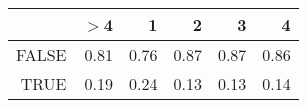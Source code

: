 \begin{table}[ht]
\centering
\begin{tabular}{rrrrrr}
  \hline
 & $>$4 & 1 & 2 & 3 & 4 \\ 
  \hline
FALSE & 0.81 & 0.76 & 0.87 & 0.87 & 0.86 \\ 
  TRUE & 0.19 & 0.24 & 0.13 & 0.13 & 0.14 \\ 
   \hline
\end{tabular}
\end{table}
